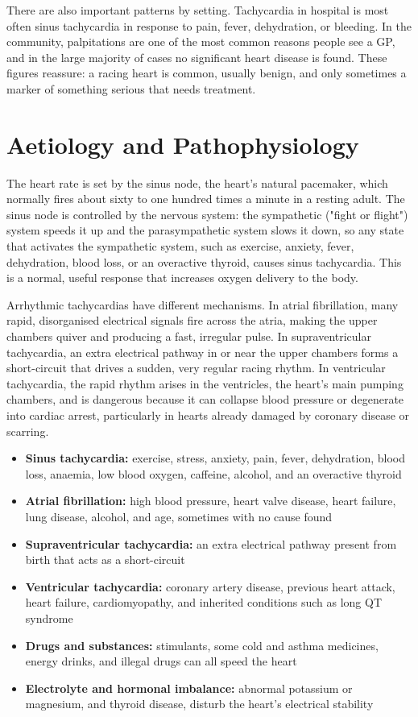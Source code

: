 There are also important patterns by setting. Tachycardia in hospital is most often sinus tachycardia in response to pain, fever, dehydration, or bleeding. In the community, palpitations are one of the most common reasons people see a GP, and in the large majority of cases no significant heart disease is found. These figures reassure: a racing heart is common, usually benign, and only sometimes a marker of something serious that needs treatment.

\section*{Aetiology and Pathophysiology}
The heart rate is set by the sinus node, the heart's natural pacemaker, which normally fires about sixty to one hundred times a minute in a resting adult. The sinus node is controlled by the nervous system: the sympathetic ("fight or flight") system speeds it up and the parasympathetic system slows it down, so any state that activates the sympathetic system, such as exercise, anxiety, fever, dehydration, blood loss, or an overactive thyroid, causes sinus tachycardia. This is a normal, useful response that increases oxygen delivery to the body.

Arrhythmic tachycardias have different mechanisms. In atrial fibrillation, many rapid, disorganised electrical signals fire across the atria, making the upper chambers quiver and producing a fast, irregular pulse. In supraventricular tachycardia, an extra electrical pathway in or near the upper chambers forms a short-circuit that drives a sudden, very regular racing rhythm. In ventricular tachycardia, the rapid rhythm arises in the ventricles, the heart's main pumping chambers, and is dangerous because it can collapse blood pressure or degenerate into cardiac arrest, particularly in hearts already damaged by coronary disease or scarring.

\begin{itemize}
    \item \textbf{Sinus tachycardia:} exercise, stress, anxiety, pain, fever, dehydration, blood loss, anaemia, low blood oxygen, caffeine, alcohol, and an overactive thyroid
    \item \textbf{Atrial fibrillation:} high blood pressure, heart valve disease, heart failure, lung disease, alcohol, and age, sometimes with no cause found
    \item \textbf{Supraventricular tachycardia:} an extra electrical pathway present from birth that acts as a short-circuit
    \item \textbf{Ventricular tachycardia:} coronary artery disease, previous heart attack, heart failure, cardiomyopathy, and inherited conditions such as long QT syndrome
    \item \textbf{Drugs and substances:} stimulants, some cold and asthma medicines, energy drinks, and illegal drugs can all speed the heart
    \item \textbf{Electrolyte and hormonal imbalance:} abnormal potassium or magnesium, and thyroid disease, disturb the heart's electrical stability
\end{itemize}


